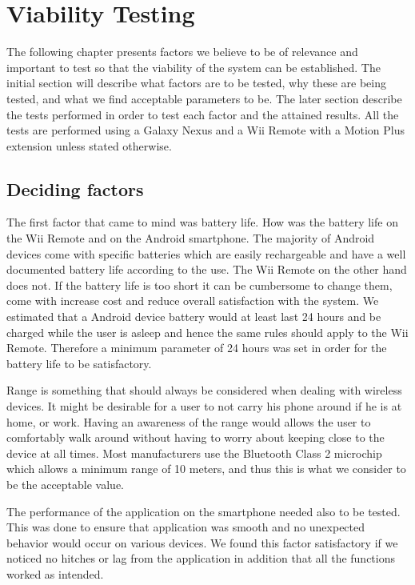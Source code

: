 \chapter{Viability Testing}
The following chapter presents factors we believe to be of relevance and important to test so that the viability of the system can be established. The initial section will describe what factors are to be tested, why these are being tested, and what we find acceptable parameters to be. The later section describe the tests performed in order to test each factor and the attained results. All the tests are performed using a Galaxy Nexus \cite{galaxyNexus} and a Wii Remote with a Motion Plus extension unless stated otherwise.

\section{Deciding factors}
The first factor that came to mind was battery life. How was the battery life on the Wii Remote and on the Android smartphone. The majority of Android devices come with specific batteries which are easily rechargeable and have a well documented battery life according to the use. The Wii Remote on the other hand does not. If the battery life is too short it can be cumbersome to change them, come with increase cost and reduce overall satisfaction with the system. We estimated that a Android device battery would at least last 24 hours and be charged while the user is asleep and hence the same rules should apply to the Wii Remote. Therefore a minimum parameter of 24 hours was set in order for the battery life to be satisfactory.

Range is something that should always be considered when dealing with wireless devices. It might be desirable for a user to not carry his phone around if he is at home, or work. Having an awareness of the range would allows the user to comfortably walk around without having to worry about keeping close to the device at all times. Most manufacturers use the Bluetooth Class 2 microchip which allows a minimum range of 10 meters, and thus this is what we consider to be the acceptable value.

The performance of the application on the smartphone needed also to be tested. This was done to ensure that application was smooth and no unexpected behavior would occur on various devices. We found this factor satisfactory if we noticed no hitches or lag from the application in addition that all the functions worked as intended.

